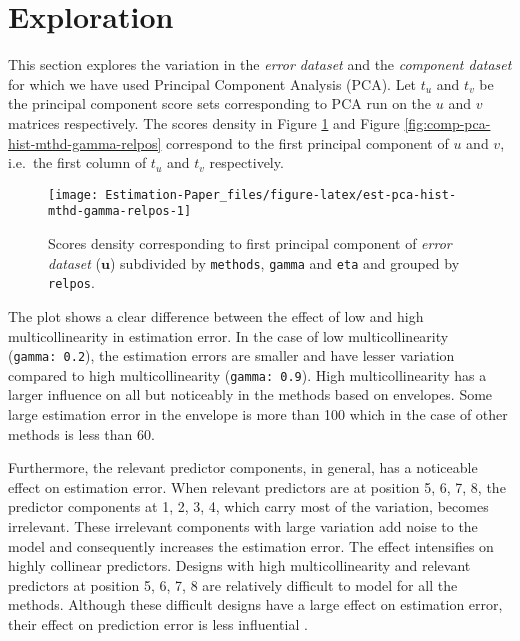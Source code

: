 \documentclass[12pt,3p,authoryear]{elsarticle}
\begin{document}
\section{Exploration}\label{exploration}

This section explores the variation in the \emph{error dataset} and the
\emph{component dataset} for which we have used Principal Component
Analysis (PCA). Let \(t_u\) and \(t_v\) be the principal component score
sets corresponding to PCA run on the \(u\) and \(v\) matrices
respectively. The scores density in Figure
\ref{fig:est-pca-hist-mthd-gamma-relpos} and Figure
\ref{fig:comp-pca-hist-mthd-gamma-relpos} correspond to the first
principal component of \(u\) and \(v\), i.e.~the first column of \(t_u\)
and \(t_v\) respectively.





\begin{figure}[!htb]
\texttt{[image: Estimation-Paper\_files/figure-latex/est-pca-hist-mthd-gamma-relpos-1]} \caption{Scores density corresponding to first principal component
of \emph{error dataset} (\(\mathbf{u}\)) subdivided by \texttt{methods},
\texttt{gamma} and \texttt{eta} and grouped by \texttt{relpos}.}\label{fig:est-pca-hist-mthd-gamma-relpos}
\end{figure}

The plot shows a clear difference between the effect of low and high
multicollinearity in estimation error. In the case of low
multicollinearity (\texttt{gamma:\ 0.2}), the estimation errors are
smaller and have lesser variation compared to high multicollinearity
(\texttt{gamma:\ 0.9}). High multicollinearity has a larger influence on
all but noticeably in the methods based on envelopes. Some large
estimation error in the envelope is more than 100 which in the case of
other methods is less than 60.

Furthermore, the relevant predictor components, in general, has a
noticeable effect on estimation error. When relevant predictors are at
position 5, 6, 7, 8, the predictor components at 1, 2, 3, 4, which carry
most of the variation, becomes irrelevant. These irrelevant components
with large variation add noise to the model and consequently increases
the estimation error. The effect intensifies on highly collinear
predictors. Designs with high multicollinearity and relevant predictors
at position 5, 6, 7, 8 are relatively difficult to model for all the
methods. Although these difficult designs have a large effect on
estimation error, their effect on prediction error is less influential
\citep{rimal2019pred}.
\end{document}
